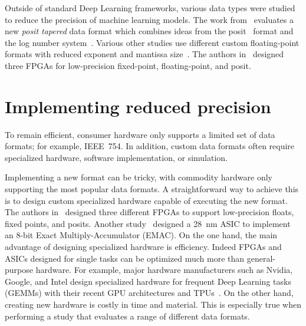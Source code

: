 Outside of standard Deep Learning frameworks, various data types were
studied to reduce the precision of machine learning models.
The work from~\cite{Johnson2018-up} evaluates a new \textit{posit tapered} data
format which combines ideas from the posit~\cite{Gustafson2017-wo} format and the log number system~\cite{Kingsbury1971-kx}.
Various other studies use different custom floating-point formats with reduced
exponent and mantissa size~\cite{Lesser2011-mn, Chen2018-an, Vicuna2021-mw, Wang2018-oo}.
The authors in~\cite{Carmichael2019-nu} designed three FPGAs for low-precision fixed-point, floating-point, and posit.

\section{Implementing reduced precision}
To remain efficient, consumer hardware only supports a limited set of data formats; for example, IEEE~754.
In addition, custom data formats often require specialized hardware, software implementation, or simulation. 

Implementing a new format can be tricky, with commodity hardware only supporting the most popular data formats.
A straightforward way to achieve this is to design custom specialized hardware capable of executing the new format.
The authors in~\cite{Carmichael2019-nu} designed three different FPGAs to support low-precision floats, fixed points, and posits.
Another study~\cite{Johnson2018-up} designed a \SI{28}{\nano\meter} ASIC to implement an 8-bit Exact Multiply-Accumulator (EMAC).
On the one hand, the main advantage of designing specialized hardware is efficiency.
Indeed FPGAs and ASICs designed for single tasks can be optimized much more than general-purpose hardware.
For example, major hardware manufacturers such as Nvidia, Google, and Intel
design specialized hardware for frequent Deep Learning tasks (GEMMs) with their
recent GPU architectures and TPUs~\cite{tpu,intel-BF16-2018}.
On the other hand, creating new hardware is costly in time and material.
This is especially true when performing a study that evaluates a range of different data formats.

